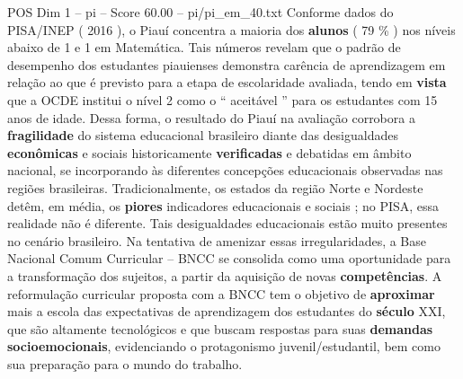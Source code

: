 \begin{textsample}{POS Dim 1 – pi – Score 60.00 – pi/pi\_em\_40.txt}
Conforme dados do PISA/INEP ( 2016 ), o Piauí concentra a maioria dos \textbf{alunos} ( 79 \% ) nos níveis abaixo de 1 e 1 em Matemática.
Tais números revelam que o padrão de desempenho dos estudantes piauienses demonstra carência de aprendizagem em relação ao que é previsto para a etapa de escolaridade avaliada, tendo em \textbf{vista} que a OCDE institui o nível 2 como o “ aceitável ” para os estudantes com 15 anos de idade.
Dessa forma, o resultado do Piauí na avaliação corrobora a \textbf{fragilidade} do sistema educacional brasileiro diante das desigualdades \textbf{econômicas} e sociais historicamente \textbf{verificadas} e debatidas em âmbito nacional, se incorporando às diferentes concepções educacionais observadas nas regiões brasileiras.
Tradicionalmente, os estados da região Norte e Nordeste detêm, em média, os \textbf{piores} indicadores educacionais e sociais ; no PISA, essa realidade não é diferente.
Tais desigualdades educacionais estão muito presentes no cenário brasileiro.
Na tentativa de amenizar essas irregularidades, a Base Nacional Comum Curricular – BNCC se consolida como uma oportunidade para a transformação dos sujeitos, a partir da aquisição de novas \textbf{competências}.
A reformulação curricular proposta com a BNCC tem o objetivo de \textbf{aproximar} mais a escola das expectativas de aprendizagem dos estudantes do \textbf{século} XXI, que são altamente tecnológicos e que buscam respostas para suas \textbf{demandas} \textbf{socioemocionais}, evidenciando o protagonismo juvenil/estudantil, bem como sua preparação para o mundo do trabalho.

\end{textsample}

